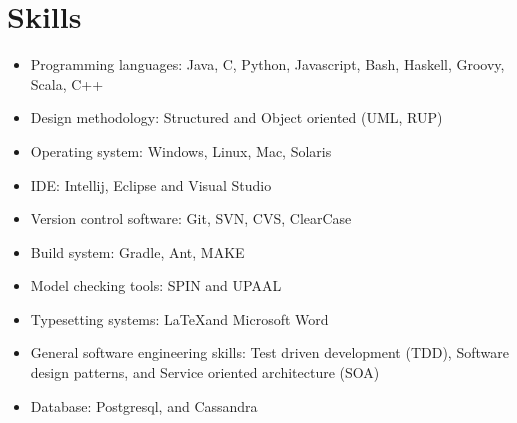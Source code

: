 \section{Skills}
\begin{itemize}
\item Programming languages: Java, C, Python, Javascript, Bash, Haskell, Groovy, Scala, C++ 

\item Design methodology: Structured and Object oriented (UML, RUP)

\item Operating system: Windows, Linux, Mac, Solaris

\item IDE: Intellij, Eclipse and Visual Studio

\item Version control software: Git, SVN, CVS, ClearCase

\item Build system: Gradle, Ant, MAKE

\item Model checking tools: SPIN and UPAAL


\item Typesetting systems: \LaTeX and Microsoft Word

\item General software engineering skills: Test driven development (TDD), Software design patterns, and Service oriented architecture (SOA)

\item Database: Postgresql, and Cassandra

\end{itemize}
